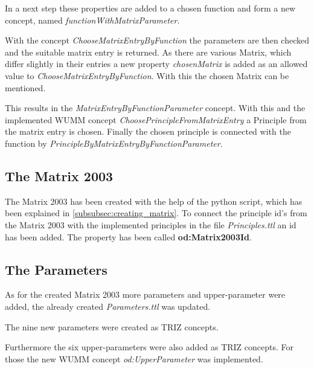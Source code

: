 In a next step these properties are added to a chosen function and form a new concept, named \textit{functionWithMatrixParameter}.

With the concept \textit{ChooseMatrixEntryByFunction} the parameters are then checked and the suitable matrix entry is returned.
As there are various Matrix, which differ slightly in their entries a new property \textit{chosenMatrix} is added as an allowed value to \textit{ChooseMatrixEntryByFunction}. 
With this the chosen Matrix can be mentioned. 

This results in the \textit{MatrixEntryByFunctionParameter} concept. 
With this and the implemented WUMM concept \textit{ChoosePrincipleFromMatrixEntry} a Principle from the matrix entry is chosen. 
Finally the chosen principle is connected with the function by \textit{PrincipleByMatrixEntryByFunctionParameter}.

\subsection{The Matrix 2003}

The Matrix 2003 has been created with the help of the python script, which has been explained in \ref{subsubsec:creating_matrix}.
To connect the principle id's from the Matrix 2003 with the implemented principles in the file \textit{Principles.ttl} an id has been added.
The property has been called \textbf{od:Matrix2003Id}.

\subsection{The Parameters}

As for the created Matrix 2003 more parameters and upper-parameter were added, the already created \textit{Parameters.ttl} was updated.

The nine new parameters were created as TRIZ concepts.

Furthermore the six upper-parameters were also added as TRIZ concepts. 
For those the new WUMM concept \textit{od:UpperParameter} was implemented.